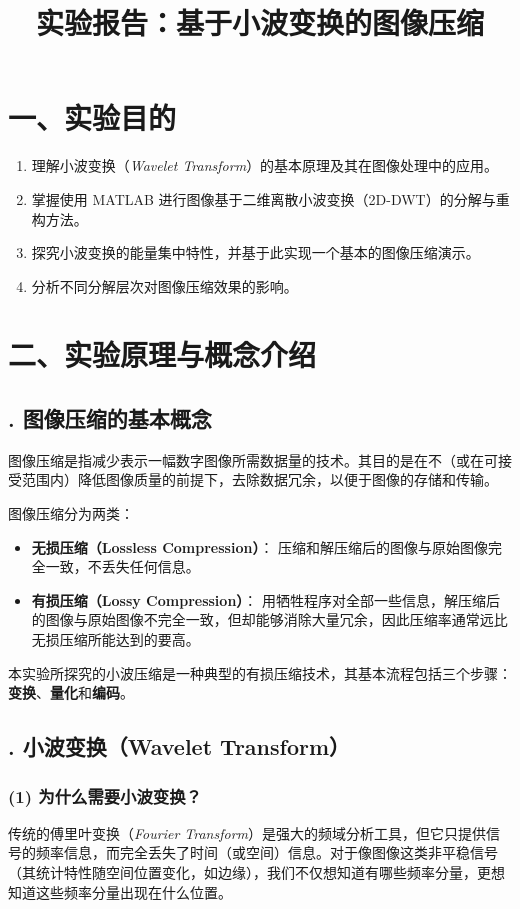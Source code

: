 \documentclass[12pt, a4paper]{article}
\title{\textbf{实验报告：基于小波变换的图像压缩}}
\author{} %
\date{}   %
\begin{document}
\maketitle %

\section*{\centering 一、实验目的}
\begin{enumerate}
    \item 理解小波变换（\textit{Wavelet Transform}）的基本原理及其在图像处理中的应用。
    \item 掌握使用 MATLAB 进行图像基于二维离散小波变换（2D-DWT）的分解与重构方法。
    \item 探究小波变换的能量集中特性，并基于此实现一个基本的图像压缩演示。
    \item 分析不同分解层次对图像压缩效果的影响。
\end{enumerate}

\section*{\centering 二、实验原理与概念介绍}
\subsection*{. 图像压缩的基本概念}
图像压缩是指减少表示一幅数字图像所需数据量的技术。其目的是在不（或在可接受范围内）降低图像质量的前提下，去除数据冗余，以便于图像的存储和传输。

图像压缩分为两类：
\begin{itemize}
    \item \textbf{无损压缩（Lossless Compression）}： 压缩和解压缩后的图像与原始图像完全一致，不丢失任何信息。
    \item \textbf{有损压缩（Lossy Compression）}： 用牺牲程序对全部一些信息，解压缩后的图像与原始图像不完全一致，但却能够消除大量冗余，因此压缩率通常远比无损压缩所能达到的要高。
\end{itemize}
本实验所探究的小波压缩是一种典型的有损压缩技术，其基本流程包括三个步骤：\textbf{变换}、\textbf{量化}和\textbf{编码}。

\subsection*{. 小波变换（Wavelet Transform）}
\subsubsection*{(1) 为什么需要小波变换？}
传统的傅里叶变换（\textit{Fourier Transform}）是强大的频域分析工具，但它只提供信号的频率信息，而完全丢失了时间（或空间）信息。对于像图像这类非平稳信号（其统计特性随空间位置变化，如边缘），我们不仅想知道有哪些频率分量，更想知道这些频率分量出现在什么位置。
\end{document}
